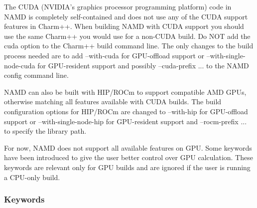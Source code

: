 The CUDA (NVIDIA's graphics processor programming platform) code in
NAMD is completely self-contained and does not use any of the CUDA
support features in Charm++.  When building NAMD with CUDA support
you should use the same Charm++ you would use for a non-CUDA build.
Do NOT add the cuda option to the Charm++ build command line.  The
only changes to the build process needed are to add --with-cuda for
GPU-offload support or --with-single-node-cuda for GPU-resident support
and possibly --cuda-prefix ... to the NAMD config command line.

NAMD can also be built with HIP/ROCm to support compatible AMD GPUs,
otherwise matching all features available with CUDA builds.
The build configuration options for HIP/ROCm are changed to
--with-hip for GPU-offload support or --with-single-node-hip for
GPU-resident support and --rocm-prefix ... to specify the library path.

For now, NAMD does not support all available features on GPU.
Some keywords have been introduced to give the user better control over
GPU calculation. These keywords are relevant only for GPU builds
and are ignored if the user is running a CPU-only build.

\subsubsection{Keywords}

